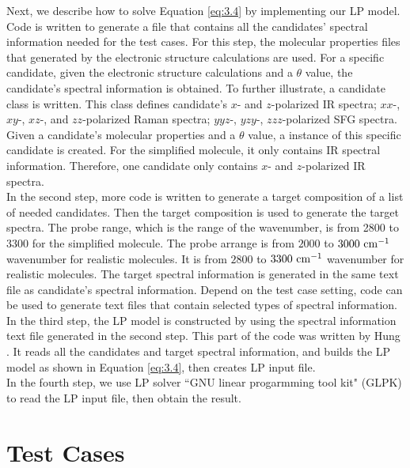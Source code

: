 Next, we describe how to solve Equation \ref{eq:3.4} by implementing our LP model. Code is written to generate a file that contains all the candidates' spectral information needed for the test cases. For this step, the molecular properties files that generated by the electronic structure calculations are used. For a specific candidate, given the electronic structure calculations and a $\theta$ value, the candidate's spectral information is obtained. To further illustrate, a candidate class is written. This class defines candidate's $x$- and $z$-polarized IR spectra; $xx$-, $xy$-, $xz$-, and $zz$-polarized Raman spectra; $yyz$-, $yzy$-, $zzz$-polarized SFG spectra. Given a candidate's molecular properties and a $\theta$ value, a instance of this specific candidate is created. For the simplified molecule, it only contains IR spectral information. Therefore, one candidate only contains $x$- and $z$-polarized IR spectra. \\

In the second step, more code is written to generate a target composition of a list of needed candidates. Then the target composition is used to generate the target spectra. The probe range, which is the range of the wavenumber, is from 2800 to 3300 for the                    simplified molecule. The probe arrange is from $2000$ to $3000~\rm cm^{-1}$ wavenumber for realistic molecules. It is from $2800$ to $3300~\rm cm^{-1}$ wavenumber for realistic molecules. The target spectral information is generated in the same text file as candidate's spectral information. Depend on the test case setting, code can be used to generate text files that contain selected types of spectral information. \\

In the third step, the LP model is constructed by using the spectral information text file generated in the second step. This part of the code was written by Hung \cite{KuoKaiHung:Thesis:2015}. It reads all the candidates and target spectral information, and builds the LP model as shown in Equation \ref{eq:3.4}, then creates LP input file. \\

In the fourth step, we use LP solver ``GNU linear progarmming tool kit" (GLPK) to read the LP input file, then obtain the result. \\

\section{Test Cases}

